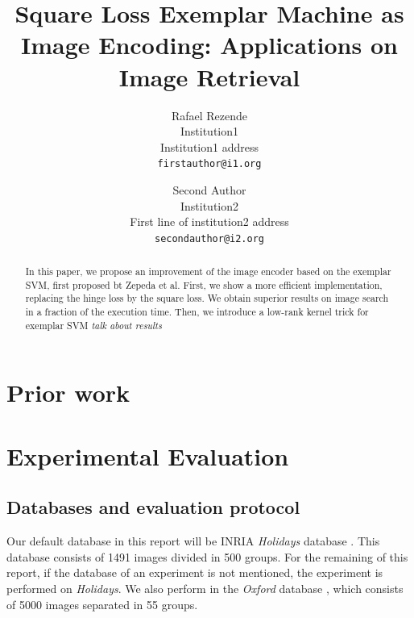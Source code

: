 \documentclass[10pt,twocolumn,letterpaper]{article}
\begin{document}
\title{Square Loss Exemplar Machine as Image Encoding: Applications on Image Retrieval}

\author{Rafael Rezende\\
Institution1\\
Institution1 address\\
{\tt\small firstauthor@i1.org}
\and
Second Author\\
Institution2\\
First line of institution2 address\\
{\tt\small secondauthor@i2.org}
}

\maketitle

\begin{abstract}
   In this paper, we propose an improvement of the image encoder based on the exemplar SVM, first proposed bt Zepeda et al.
   First, we show a more efficient implementation, replacing the hinge loss by the square loss. 
   We obtain superior results on image search in a fraction of the execution time.
   Then, we introduce a low-rank kernel trick for exemplar SVM \emph{\color{red} talk about results} 
\end{abstract}



\section{Prior work}







\section{Experimental Evaluation}
\subsection{Databases and evaluation protocol} \label{eval:protocol}
Our default database in this report will be INRIA \emph{Holidays} database \cite{holidays}. This database consists of 1491 images divided in 500 groups. For the remaining of this report, if the database of an experiment is not mentioned, the experiment is performed on \emph{Holidays}.
We also perform in the \emph{Oxford} database \cite{oxford}, which consists of 5000 images separated in 55 groups.
\end{document}

